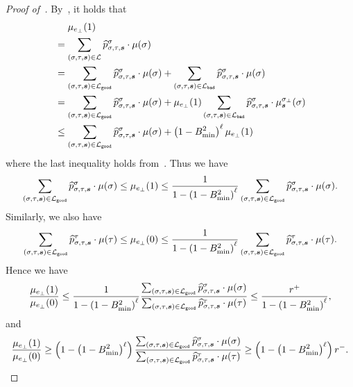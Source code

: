 \documentclass[11pt]{article}
\def\!#1{\mathtt{#1}}
\def\bad{\!{bad}}
\def\good{\!{good}}
\def\symbolwidth{\phantom{{}={}}}
\newcommand{\wh}[1]{\widehat{#1}}
\newcommand{\seqS}{\boldsymbol{s}}
\begin{document}
\begin{proof}[Proof of~]
    By~, it holds that
    \begin{align*}
        &\symbolwidth \mu_{e_\bot}(1) \\
        &= \sum_{(\sigma, \tau, \seqS) \in \+L} \wh{p}_{\sigma, \tau, \seqS}^{\sigma} \cdot \mu(\sigma) \\
        &= \sum_{(\sigma, \tau, \seqS) \in \+L_{\good}} \wh{p}_{\sigma, \tau, \seqS}^{\sigma} \cdot  \mu(\sigma) + \sum_{(\sigma, \tau, \seqS) \in \+L_{\bad}} \wh{p}_{\sigma, \tau, \seqS}^{\sigma} \cdot  \mu(\sigma) \\
        &= \sum_{(\sigma, \tau, \seqS) \in \+L_{\good}} \wh{p}_{\sigma, \tau, \seqS}^{\sigma} \cdot \mu(\sigma) + \mu_{e_\bot}(1) \sum_{(\sigma, \tau, \seqS) \in \+L_{\bad}} \wh{p}_{\sigma, \tau, \seqS}^{\sigma} \cdot \mu_{\seqS}^{\sigma_{\bot}}(\sigma)\\
        &\le \sum_{(\sigma, \tau, \seqS) \in \+L_{\good}} \wh{p}_{\sigma, \tau, \seqS}^{\sigma} \cdot \mu(\sigma) + \left(1 - B_{\min}^2\right)^{\ell} \mu_{e_\bot}(1)
    \end{align*}
    where the last inequality holds from~. Thus we have
    $$
        \sum_{(\sigma, \tau, \seqS) \in \+L_{\good}} \wh{p}_{\sigma, \tau, \seqS}^{\sigma} \cdot \mu(\sigma) \le \mu_{e_\bot}(1) \le \frac{1}{1 - \left(1 - B_{\min}^2\right)^{\ell}} \sum_{(\sigma, \tau, \seqS) \in \+L_{\good}} \wh{p}_{\sigma, \tau, \seqS}^{\sigma} \cdot \mu(\sigma).
    $$
    Similarly, we also have
    $$
        \sum_{(\sigma, \tau, \seqS) \in \+L_{\good}} \wh{p}_{\sigma, \tau, \seqS}^{\tau} \cdot\mu(\tau)\le \mu_{e_\bot}(0) \le \frac{1}{1 - \left(1 - B_{\min}^2\right)^{\ell}} \sum_{(\sigma, \tau, \seqS) \in \+L_{\good}} \wh{p}_{\sigma, \tau, \seqS}^{\tau} \cdot \mu(\tau).
    $$
    Hence we have
    \begin{align*}
        \frac{\mu_{e_\bot}(1)}{\mu_{e_\bot}(0)} \le \frac{1}{1 - \left(1 - B_{\min}^2\right)^{\ell}} \frac{\sum_{(\sigma, \tau, \seqS) \in \+L_{\good}} \wh{p}_{\sigma, \tau, \seqS}^{\sigma} \cdot \mu(\sigma)}{\sum_{(\sigma, \tau, \seqS) \in \+L_{\good}} \wh{p}_{\sigma, \tau, \seqS}^{\tau} \cdot \mu(\tau)} 
        \le \frac{r^+}{1 - \left(1 - B_{\min}^2\right)^{\ell}},
    \end{align*}
    and
    \begin{align*}
       \frac{\mu_{e_\bot}(1)}{\mu_{e_\bot}(0)} \ge \left(1 - \left(1 - B_{\min}^2\right)^{\ell}\right) \frac{\sum_{(\sigma, \tau, \seqS) \in \+L_{\good}} \wh{p}_{\sigma, \tau, \seqS}^{\sigma} \cdot \mu(\sigma)}{\sum_{(\sigma, \tau, \seqS) \in \+L_{\good}} \wh{p}_{\sigma, \tau, \seqS}^{\tau} \cdot \mu(\tau)} 
        \ge \left(1 - \left(1 - B_{\min}^2\right)^{\ell}\right) r^-.
    \end{align*}
\end{proof}
\end{document}
